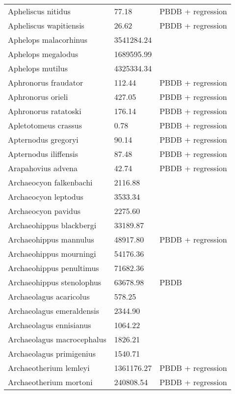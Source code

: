 \documentclass{article}
\begin{document}
\begin{center}
\begin{longtable}{p{} p{} p{}}
    Apheliscus nitidus & 77.18 & PBDB + regression \\ 
    Apheliscus wapitiensis & 26.62 & PBDB + regression \\ 
    Aphelops malacorhinus & 3541284.24 & \cite{Tomiya2013} \\ 
    Aphelops megalodus & 1689595.99 & \cite{Tomiya2013} \\ 
    Aphelops mutilus & 4325334.34 & \cite{Tomiya2013} \\ 
    Aphronorus fraudator & 112.44 & PBDB + regression \\ 
    Aphronorus orieli & 427.05 & PBDB + regression \\ 
    Aphronorus ratatoski & 176.14 & PBDB + regression \\ 
    Apletotomeus crassus & 0.78 & PBDB + regression \\ 
    Apternodus gregoryi & 90.14 & PBDB + regression \\ 
    Apternodus iliffensis & 87.48 & PBDB + regression \\ 
    Arapahovius advena & 42.74 & PBDB + regression \\ 
    Archaeocyon falkenbachi & 2116.88 & \cite{Stirton1932} \\ 
    Archaeocyon leptodus & 3533.34 & \cite{Tomiya2013} \\ 
    Archaeocyon pavidus & 2275.60 & \cite{Tomiya2013} \\ 
    Archaeohippus blackbergi & 33189.87 & \cite{Tomiya2013} \\ 
    Archaeohippus mannulus & 48917.80 & PBDB + regression \\ 
    Archaeohippus mourningi & 54176.36 & \cite{Tomiya2013} \\ 
    Archaeohippus penultimus & 71682.36 & \cite{Tomiya2013} \\ 
    Archaeohippus stenolophus & 63678.98 & PBDB \\ 
    Archaeolagus acaricolus & 578.25 & \cite{Tomiya2013} \\ 
    Archaeolagus emeraldensis & 2344.90 & \cite{Tomiya2013} \\ 
    Archaeolagus ennisianus & 1064.22 & \cite{Tomiya2013} \\ 
    Archaeolagus macrocephalus & 1826.21 & \cite{Tomiya2013} \\ 
    Archaeolagus primigenius & 1540.71 & \cite{Tomiya2013} \\ 
    Archaeotherium lemleyi & 1361176.27 & PBDB + regression \\ 
    Archaeotherium mortoni & 240808.54 & PBDB + regression \\ 

\end{longtable}
\end{center}
\end{document}
